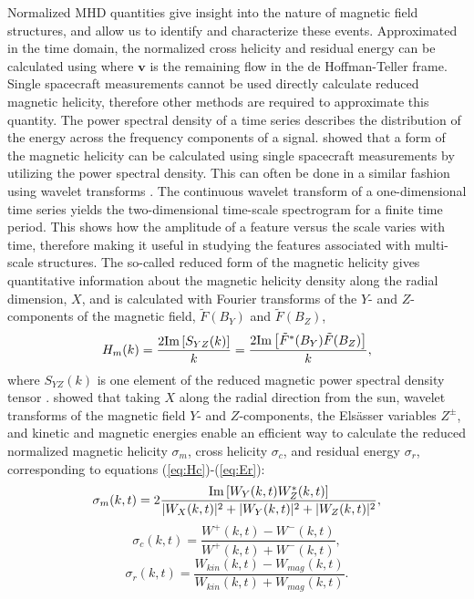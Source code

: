 Normalized MHD quantities give insight into the nature of magnetic field structures, and allow us to identify and characterize these events. Approximated in the time domain, the normalized cross helicity and residual energy can be calculated using
where $\mathbf{v}$ is the remaining flow in the de Hoffman-Teller frame. Single spacecraft measurements cannot be used directly calculate reduced magnetic helicity, therefore other methods are required to approximate this quantity. The power spectral density of a time series describes the distribution of the energy across the frequency components of a signal. \cite{Matthaeus:1982} showed that a form of the magnetic helicity can be calculated using single spacecraft measurements by utilizing the power spectral density. This can often be done in a similar fashion using wavelet transforms \citep{Telloni:2012, Telloni:2013}. The continuous wavelet transform of a one-dimensional time series yields the two-dimensional time-scale spectrogram for a finite time period. This shows how the amplitude of a feature versus the scale varies with time, therefore making it useful in studying the features associated with multi-scale structures. The so-called reduced form of the magnetic helicity gives quantitative information about the magnetic helicity density along the radial dimension, $X$, and is calculated with Fourier transforms of the $Y$- and $Z$-components of the magnetic field, $\tilde F(B_Y)$ and $\tilde F(B_Z)$,
\begin{equation}
    H_m(k) = \frac{2 \textnormal{Im}\left[S_{YZ} (k)\right]}{k} = \frac{2 \textnormal{Im}\left[ \tilde F^*(B_Y)\tilde F(B_Z) \right]}{k},
\end{equation}
where $S_{YZ}(k)$ is one element of the reduced magnetic power spectral density tensor \citep{Matthaeus:1982}. \cite{Telloni:2012} showed that taking $X$ along the radial direction from the sun, wavelet transforms of the magnetic field $Y$- and $Z$-components, the Els\"asser variables $Z^\pm$, and kinetic and magnetic energies enable an efficient way to calculate the reduced normalized magnetic helicity $\sigma_m$, cross helicity $\sigma_c$, and residual energy $\sigma_r$, corresponding to equations (\ref{eq:Hc})-(\ref{eq:Er}):
\begin{equation}
    \sigma_m(k,t) = 2\frac{\textnormal{Im}\left[W_Y(k,t)W_Z^*(k,t)\right]}{|W_X(k,t)|^2 + |W_Y(k,t)|^2 + |W_Z(k,t)|^2} ,
    \label{eq:sigm}
\end{equation}
\begin{equation}
    \sigma_c(k,t) = \frac{W^+(k,t)-W^-(k,t)}{W^+(k,t)+W^-(k,t)} ,
    \label{eq:sigc}
\end{equation}
 \begin{equation}
    \sigma_r(k,t) = \frac{W_{kin}(k,t) - W_{mag}(k,t)}{W_{kin}(k,t) + W_{mag}(k,t)} .
    \label{eq:sigr}
\end{equation}

